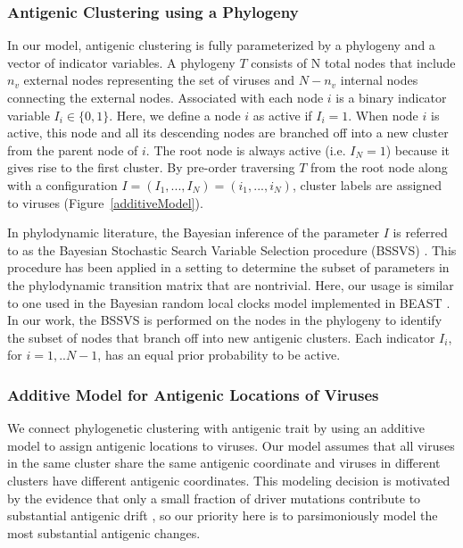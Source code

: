 \documentclass[11pt,oneside,letterpaper]{article}
\begin{document}
\subsubsection*{Antigenic Clustering using a Phylogeny}

In our model, antigenic clustering is fully parameterized by  a phylogeny and a vector of indicator variables.
A phylogeny $T$ consists of N total nodes that include $n_v$ external nodes representing the set of viruses and $N-n_v$ internal nodes connecting the external nodes.
Associated with each node $i$ is a binary indicator variable $I_i \in \{0,1\}$. 
Here, we define a node $i$ as active if $I_i = 1$.
When node $i$ is active, this node and all its descending nodes are branched off into a new cluster from the parent node of $i$.
The root node is always active (i.e. $I_{N} = 1$) because it gives rise to the first cluster.
By pre-order traversing $T$ from the root node along with a configuration $I=(I_1, ..., I_N)=(i_1, ..., i_N)$, cluster labels are assigned to viruses (Figure~\ref{additiveModel}).

In phylodynamic literature, the Bayesian inference of the parameter $I$ is referred to as the Bayesian Stochastic Search Variable Selection procedure (BSSVS) \cite{lemey_bayesian_2009}.
This procedure has been applied in a setting to determine the subset of parameters in the phylodynamic transition matrix that are nontrivial. 
Here, our usage is similar to one used in the Bayesian random local clocks model implemented in BEAST \cite{drummond_bayesian_2010}.
In our work, the BSSVS is performed on the nodes in the phylogeny to identify the subset of nodes that branch off into new antigenic clusters. 
Each indicator $I_i$, for $i=1,..N-1$, has an equal prior probability to be active.



\subsubsection*{Additive Model for Antigenic Locations of Viruses}

We connect phylogenetic clustering with antigenic trait by using an additive model to assign antigenic locations to viruses. 
Our model assumes that all viruses in the same cluster share the same antigenic coordinate and viruses in different clusters have different antigenic coordinates.
This modeling decision is motivated by the evidence that only a small fraction of driver mutations contribute to substantial antigenic drift \cite{koel_substitutions_2013}, so our priority here is to parsimoniously model the most substantial antigenic changes.
\end{document}
